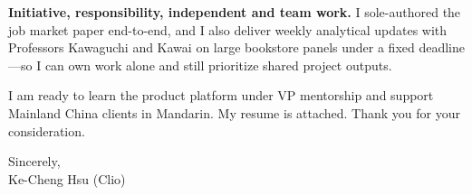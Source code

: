 \documentclass[11pt,letterpaper]{article}
\begin{document}
\textbf{Initiative, responsibility, independent and team work.} I sole-authored the job market paper end-to-end, and I also deliver weekly analytical updates with Professors Kawaguchi and Kawai on large bookstore panels under a fixed deadline---so I can own work alone and still prioritize shared project outputs.

I am ready to learn the product platform under VP mentorship and support Mainland China clients in Mandarin. My resume is attached. Thank you for your consideration.

\vspace{0.3em}
Sincerely,\\[0.25em]
Ke-Cheng Hsu (Clio)
\end{document}
